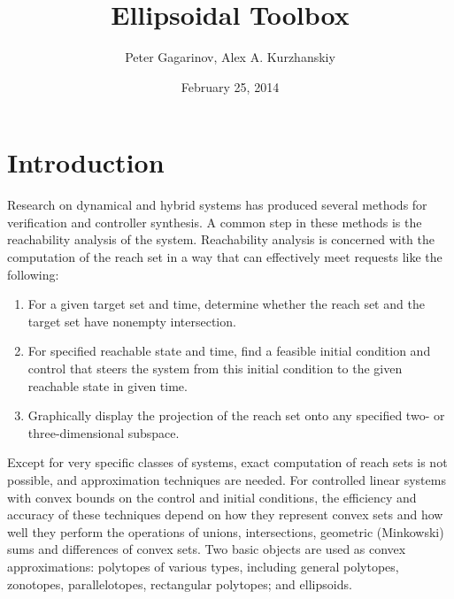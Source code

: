 \documentclass[letterpaper,10pt,english]{sphinxmanual}
\title{Ellipsoidal Toolbox}
\date{February 25, 2014}
\author{Peter Gagarinov, Alex A. Kurzhanskiy}
\begin{document}
\maketitle
\tableofcontents
{}\label{main_manual::doc}



\chapter{Introduction}
\label{chap_intro:introduction}\label{chap_intro::doc}\label{chap_intro:welcome-to-ellipsoidal-toolbox-documentation}
Research on dynamical and hybrid systems has produced several methods
for verification and controller synthesis. A common step in these
methods is the reachability analysis of the system. Reachability
analysis is concerned with the computation of the reach set in a way
that can effectively meet requests like the following:
\begin{enumerate}
\item {} 
For a given target set and time, determine whether the reach set and
the target set have nonempty intersection.

\item {} 
For specified reachable state and time, find a feasible initial
condition and control that steers the system from this initial
condition to the given reachable state in given time.

\item {} 
Graphically display the projection of the reach set onto any
specified two- or three-dimensional subspace.

\end{enumerate}

Except for very specific classes of systems, exact computation of reach
sets is not possible, and approximation techniques are needed. For
controlled linear systems with convex bounds on the control and initial
conditions, the efficiency and accuracy of these techniques depend on
how they represent convex sets and how well they perform the operations
of unions, intersections, geometric (Minkowski) sums and differences of
convex sets. Two basic objects are used as convex approximations:
polytopes of various types, including general polytopes, zonotopes,
parallelotopes, rectangular polytopes; and ellipsoids.
\end{document}
